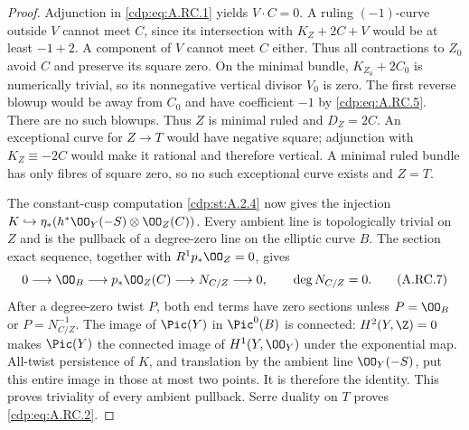 \begin{proof}
Adjunction in \eqref{cdp:eq:A.RC.1} yields $V\cdot C=0$. A ruling
$(-1)$-curve outside $V$ cannot meet $C$, since its
intersection with $K_Z+2C+V$ would be at least $-1+2$.
A component of $V$ cannot meet $C$ either. Thus all
contractions to $Z_0$ avoid $C$ and preserve its square zero.
On the minimal bundle, $K_{Z_0}+2C_0$ is numerically trivial,
so its nonnegative vertical divisor $V_0$ is zero.
The first reverse blowup would be away from $C_0$ and have
coefficient $-1$ by \eqref{cdp:eq:A.RC.5}. There are no such blowups.
Thus $Z$ is minimal ruled and $D_Z=2C$.
An exceptional curve for $Z\to T$ would have negative square;
adjunction with $K_Z\equiv-2C$ would make it rational and
therefore vertical. A minimal ruled bundle has only fibres
of square zero, so no such exceptional curve exists and $Z=T$.

The constant-cusp computation \ref{cdp:st:A.2.4} now gives the injection
$K\hookrightarrow\eta_*(h^*\OO_Y(-S)\otimes\OO_Z(C))$.
Every ambient line is topologically trivial on $Z$ and is
the pullback of a degree-zero line on the elliptic curve $B$.
The section exact sequence, together with $R^1p_*\OO_Z=0$,
gives
\[
 0\longrightarrow\OO_B\longrightarrow p_*\OO_Z(C)
 \longrightarrow N_{C/Z}\longrightarrow0,
 \qquad\deg N_{C/Z}=0.                              \tag{A.RC.7}\label{cdp:eq:A.RC.7}
\]
After a degree-zero twist $P$, both end terms have zero
sections unless $P=\OO_B$ or $P=N_{C/Z}^{-1}$.
The image of $\Pic(Y)$ in $\Pic^0(B)$ is connected:
$H^2(Y,\Z)=0$ makes $\Pic(Y)$ the connected image of
$H^1(Y,\OO_Y)$ under the exponential map.
All-twist persistence of $K$, and translation by the ambient
line $\OO_Y(-S)$, put this entire image in those at most two
points. It is therefore the identity. This proves triviality
of every ambient pullback. Serre duality on $T$ proves
\eqref{cdp:eq:A.RC.2}.
\end{proof}


